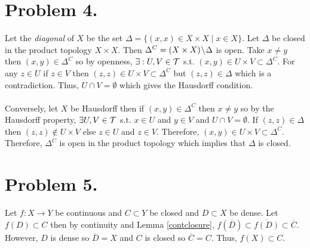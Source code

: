 \documentclass[12pt]{extarticle}
\begin{document}
\section*{Problem 4.}
Let the \textit{diagonal} of $X$ be the set $\Delta = \{(x, x) \in X \times X \mid x \in X\}$. Let $\Delta$ be closed in the product topology $X \times X$. Then $\Delta^C = (X \times X) \! \setminus \! \Delta$ is open. Take $x \neq y$ then $(x, y) \in \Delta^C$ so by openness, $\exists : U, V \in \mathcal{T}$ s.t. $(x, y) \in U \times V \subset \Delta^C$. For any $z \in U$ if $z \in V$ then $(z, z) \in U \times V \subset \Delta^C$ but $(z, z) \in \Delta$ which is a contradiction. Thus, $U \cap V = \emptyset$ which gives the Hausdorff condition. \\ \\
Conversely, let $X$ be Hausdorff then if $(x, y) \in \Delta^C$ then $x \neq y$ so by the Hausdorff property, $\exists U, V \in \mathcal{T}$ s.t. $x \in U$ and $y \in V$ and $U \cap V = \emptyset$. If $(z, z) \in \Delta$ then $(z, z) \notin U \times V$ else $z \in U$ and $z \in V$. Therefore, $(x, y) \in U \times V \subset \Delta^C$. Therefore, $\Delta^C$ is open in the product topology which implies that $\Delta$ is closed. 

\section*{Problem 5.}

Let $f : X \rightarrow Y$ be continuous and $C \subset Y$ be closed and $D \subset X$ be dense. Let $f(D) \subset C$ then by continuity and Lemma \ref{contclosure}, $f(\overline{D}) \subset \overline{f(D)} \subset \overline{C}$. However, $D$ is dense so $\overline{D} = X$ and $C$ is closed so $\overline{C} = C$. Thus, $f(X) \subset C$.
\end{document}
